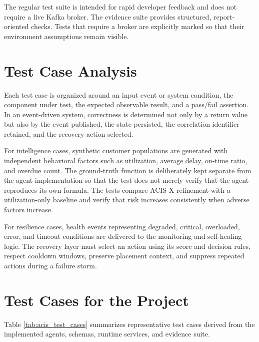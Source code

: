 \documentclass[a4paper, 12pt]{report}
\begin{document}
The regular test suite is intended for rapid developer feedback and does not require a live Kafka broker. The evidence suite provides structured, report-oriented checks. Tests that require a broker are explicitly marked so that their environment assumptions remain visible.

\section{Test Case Analysis}
Each test case is organized around an input event or system condition, the component under test, the expected observable result, and a pass/fail assertion. In an event-driven system, correctness is determined not only by a return value but also by the event published, the state persisted, the correlation identifier retained, and the recovery action selected.

For intelligence cases, synthetic customer populations are generated with independent behavioral factors such as utilization, average delay, on-time ratio, and overdue count. The ground-truth function is deliberately kept separate from the agent implementation so that the test does not merely verify that the agent reproduces its own formula. The tests compare ACIS-X refinement with a utilization-only baseline and verify that risk increases consistently when adverse factors increase.

For resilience cases, health events representing degraded, critical, overloaded, error, and timeout conditions are delivered to the monitoring and self-healing logic. The recovery layer must select an action using its score and decision rules, respect cooldown windows, preserve placement context, and suppress repeated actions during a failure storm.

\section{Test Cases for the Project}
Table \ref{tab:acis_test_cases} summarizes representative test cases derived from the implemented agents, schemas, runtime services, and evidence suite.
\end{document}

